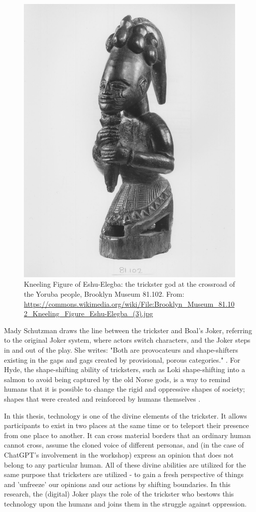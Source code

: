 \documentclass[dissertation,math,vertlayout,pdfa,colorlinks,nologo]{aaltoseries}
\begin{document}
\begin{figure}
    \centering
    \includegraphics[width=0.5\linewidth]{eshu.jpeg}
    \caption{Kneeling Figure of Eshu-Elegba: the trickster god at the crossroad of the Yoruba people, Brooklyn Museum 81.102. From: \url{https://commons.wikimedia.org/wiki/File:Brooklyn_Museum_81.102_Kneeling_Figure_Eshu-Elegba_(3).jpg}}
    \label{fig:eshu}
\end{figure}

Mady Schutzman draws the line between the trickster and Boal's Joker, referring to the original Joker system, where actors switch characters, and the Joker steps in and out of the play. She writes: "Both are provocateurs and shape-shifters existing in the gaps and gags created by provisional, porous categories." \cite[p. 97]{schutzmanRadicalDoubtJoker2018}. For Hyde, the shape-shifting ability of tricksters, such as Loki shape-shifting into a salmon to avoid being captured by the old Norse gods, is a way to remind humans that it is possible to change the rigid and oppressive shapes of society; shapes that were created and reinforced by humans themselves \cite[c. 11]{hydeTricksterMakesThis2017}.

In this thesis, technology is one of the divine elements of the trickster. It allows participants to exist in two places at the same time or to teleport their presence from one place to another. It can cross material borders that an ordinary human cannot cross, assume the cloned voice of different personas, and (in the case of ChatGPT's involvement in the workshop) express an opinion that does not belong to any particular human. All of these divine abilities are utilized for the same purpose that tricksters are utilized - to gain a fresh perspective of things and 'unfreeze' our opinions and our actions by shifting boundaries. In this research, the (digital) Joker plays the role of the trickster who bestows this technology upon the humans and joins them in the struggle against oppression. 
\end{document}
